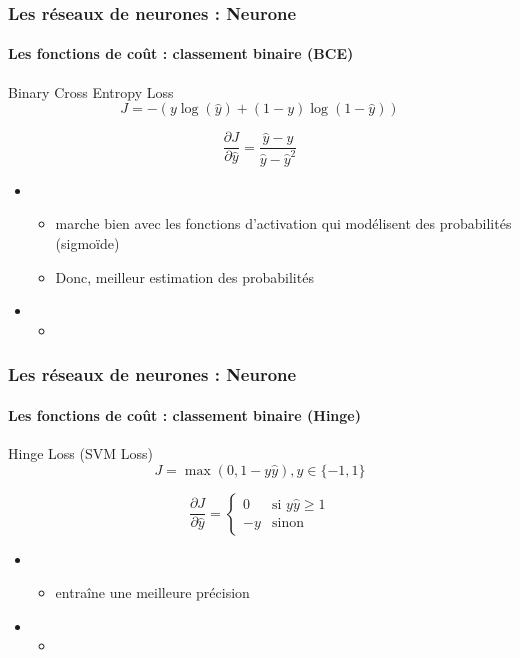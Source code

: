 \documentclass[xcolor=table]{beamer}
\begin{document}
\begin{frame}
\frametitle{Les réseaux de neurones : Neurone}
\framesubtitle{Les fonctions de coût : classement binaire (BCE)}

\begin{block}{Binary Cross Entropy Loss}
	\[J = - (y \log(\hat{y}) + (1 - y) \log(1 - \hat{y}))\]
	
	\[
	\frac{\partial J}{\partial \hat{y}} = \frac{\hat{y} - y}{\hat{y} - \hat{y}^2}
	\]
\end{block}

\begin{itemize}
	\item {}
	\begin{itemize}
		\item marche bien avec les fonctions d'activation qui modélisent des probabilités (sigmoïde)
		\item Donc, meilleur estimation des probabilités
	\end{itemize}
	\item {}
	\begin{itemize}
		\item 
	\end{itemize}
\end{itemize}

\end{frame}

\begin{frame}
\frametitle{Les réseaux de neurones : Neurone}
\framesubtitle{Les fonctions de coût : classement binaire (Hinge)}

\begin{block}{Hinge Loss (SVM Loss)}
	\[J = \max(0, 1 - y \hat{y}), y \in \{-1, 1\}\]
	
	\[
	\frac{\partial J}{\partial \hat{y}} = 
	\begin{cases}
	0 & \text{si } y \hat{y} \ge 1 \\
	-y & \text{sinon}
	\end{cases}
	\]
\end{block}

\begin{itemize}
	\item {}
	\begin{itemize}
		\item entraîne une meilleure précision
	\end{itemize}
	\item {}
	\begin{itemize}
		\item 
	\end{itemize}
\end{itemize}

\end{frame}
\end{document}
